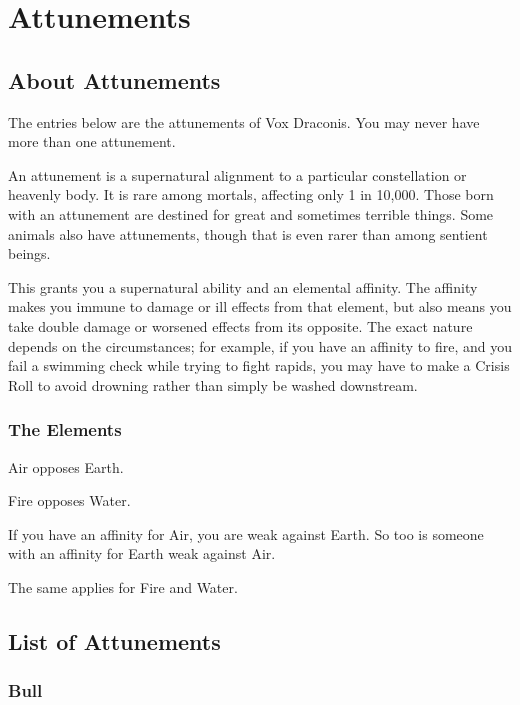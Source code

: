 \chapter{Attunements}

\begin{multicols}{2}

\section{About Attunements}

The entries below are the attunements of Vox Draconis. You may
never have more than one attunement.

An attunement is a supernatural alignment to a particular
constellation or heavenly body. It is rare among mortals,
affecting only 1 in 10,000. Those born with an attunement
are destined for great and sometimes terrible things. Some
animals also have attunements, though that is even rarer than
among sentient beings.

This grants you a supernatural ability and an elemental affinity.
The affinity  makes you immune to damage or
ill effects from that element, but also means you take double
damage or worsened effects from its opposite. The exact nature
depends on the circumstances; for example, if you have an
affinity to fire, and you fail a swimming check while trying to fight
rapids, you may have to make a Crisis Roll to avoid drowning
rather than simply be washed downstream.

\subsection{The Elements}

Air opposes Earth.

Fire opposes Water.

If you have an affinity for Air, you are weak against Earth. So
too is someone with an affinity for Earth weak against Air.

The same applies for Fire and Water.

\section{List of Attunements}

\subsection{Bull}


\end{multicols}
